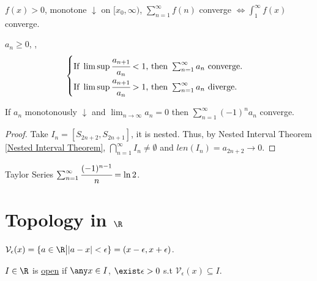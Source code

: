 \begin{theorem}
\label{Integral Test}
    $f(x)>0$, monotone $\downarrow$ on $[x_0, \infty)$, $\sum_{n=1}^\infty f(n)$ converge $\Leftrightarrow \int_1^\infty f(x)$ converge.
\end{theorem}

\begin{theorem}
\label{Ratio Test}
    $a_n \geq0$, ,
    \[\begin{cases}
        \text{If }\limsup \cfrac{a_{n+1}}{a_n} <1 \text{, then } \sum_{n=1}^\infty a_n \text{ converge}.\\
        \text{If }\limsup \cfrac{a_{n+1}}{a_n} >1 \text{, then } \sum_{n=1}^\infty a_n \text{ diverge}.
    \end{cases}\]
\end{theorem}

\begin{theorem}
\label{Alternative Series Test}
    If $a_n$ monotonously  $\downarrow$ and  $\lim_{n\to\infty} a_n =0$ then $\sum_{n=1}^\infty (-1)^n a_n$ converge. 
\end{theorem}
\begin{proof}
    Take $I_n = [S_{2n+2}, S_{2n+1}]$, it is nested. Thus, by Nested Interval Theorem \ref{Nested Interval Theorem}, $\bigcap\limits_{n=1}^{\infty} I_n \neq \emptyset$ and $len(I_n) = a_{2n+2} \rightarrow 0$.
\end{proof}
\begin{example}
    Taylor Series $\sum_{n=1}^\infty \cfrac{(-1)^{n-1}}{n} = \ln 2$.
\end{example}    


\section{Topology in $\R$}
\begin{definition}
    $\mathcal{V}_\epsilon (x) = \{ a \in \R \bigl| |a-x| < \epsilon \} = (x-\epsilon, x+ \epsilon)$.
\end{definition}
\begin{definition}
    $I \in \R$ is \uline{open} if $\any x \in I$, $\exist \epsilon>0$ s.t $\mathcal{V}_\epsilon (x) \subseteq I$.
\end{definition}

